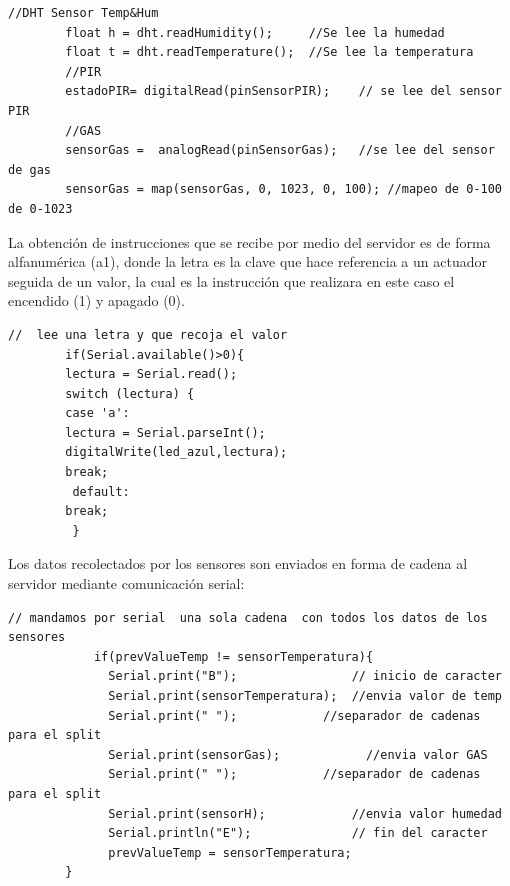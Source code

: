 \documentclass[11pt,letterpaper]{report}
\begin{document}
		\begin{lstlisting}[language=Arduino]
		//DHT Sensor Temp&Hum
		float h = dht.readHumidity();     //Se lee la humedad
		float t = dht.readTemperature();  //Se lee la temperatura
		//PIR
		estadoPIR= digitalRead(pinSensorPIR);    // se lee del sensor PIR
		//GAS
		sensorGas =  analogRead(pinSensorGas);   //se lee del sensor de gas
		sensorGas = map(sensorGas, 0, 1023, 0, 100); //mapeo de 0-100 de 0-1023
		\end{lstlisting}
La obtención de instrucciones que se recibe por medio del servidor es de forma alfanumérica (a1), donde la letra es la clave que hace referencia a un actuador seguida de un valor, la cual es la instrucción que realizara en este caso el encendido (1) y apagado (0).
		\begin{lstlisting}[language=Arduino]
		 //  lee una letra y que recoja el valor
        if(Serial.available()>0){
    	lectura = Serial.read();  
    	switch (lectura) {
    	case 'a':
       	lectura = Serial.parseInt();
       	digitalWrite(led_azul,lectura);
      	break;
   		 default: 
    	break;
 		 }
		\end{lstlisting}

Los datos recolectados por los sensores son enviados en forma de cadena al servidor mediante comunicación serial:
		\begin{lstlisting}[language=Arduino]
			// mandamos por serial  una sola cadena  con todos los datos de los sensores 
		    if(prevValueTemp != sensorTemperatura){
		      Serial.print("B");                // inicio de caracter 
		      Serial.print(sensorTemperatura);  //envia valor de temp
		      Serial.print(" ");            //separador de cadenas para el split
		      Serial.print(sensorGas);            //envia valor GAS
		      Serial.print(" ");            //separador de cadenas para el split
		      Serial.print(sensorH);            //envia valor humedad
		      Serial.println("E");              // fin del caracter
		      prevValueTemp = sensorTemperatura;
		}
		\end{lstlisting}
\end{document}
